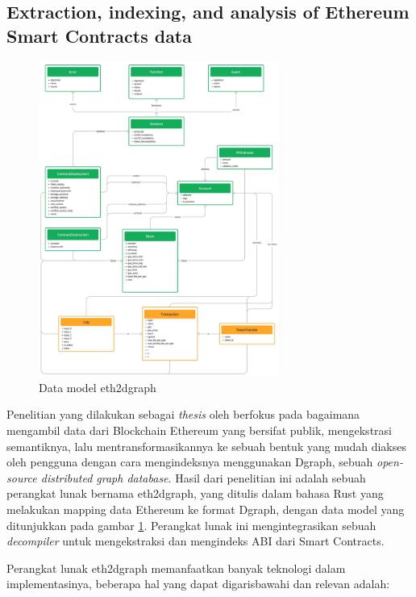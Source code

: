 \subsection{Extraction, indexing, and analysis of Ethereum Smart Contracts data}
\label{subsec:extraction-indexing-analysis-ethereum-sc}

\begin{figure}[ht]
  \centering
  \includegraphics[width=0.7\textwidth]{resources/chapter-2/eth2dgraph-structure.jpg}
  \caption{Data model eth2dgraph \parencite{aimar2023extraction}}
  \label{image:eth2dgraph-structure}
\end{figure}

Penelitian yang dilakukan sebagai \textit{thesis} oleh \cite{aimar2023extraction} berfokus pada bagaimana mengambil data dari Blockchain Ethereum yang bersifat publik, mengekstrasi semantiknya, lalu mentransformasikannya ke sebuah bentuk yang mudah diakses oleh pengguna dengan cara mengindeksnya menggunakan Dgraph, sebuah \textit{open-source distributed graph database}. Hasil dari penelitian ini adalah sebuah perangkat lunak bernama eth2dgraph, yang ditulis dalam bahasa Rust yang melakukan mapping data Ethereum ke format Dgraph, dengan data model yang ditunjukkan pada gambar \ref{image:eth2dgraph-structure}. Perangkat lunak ini mengintegrasikan sebuah \textit{decompiler} untuk mengekstraksi dan mengindeks ABI dari Smart Contracts.

Perangkat lunak eth2dgraph memanfaatkan banyak teknologi dalam implementasinya, beberapa hal yang dapat digarisbawahi dan relevan adalah:

